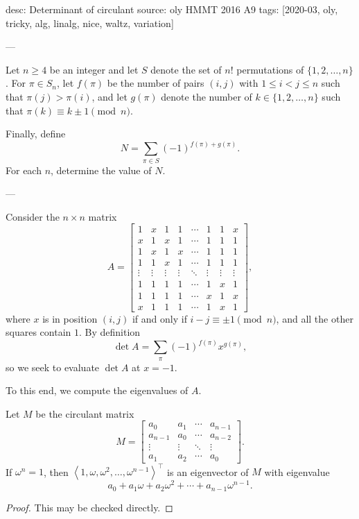 desc: Determinant of circulant
source: oly HMMT 2016 A9
tags: [2020-03, oly, tricky, alg, linalg, nice, waltz, variation]

---

Let $n\ge4$ be an integer and let $S$ denote the set of $n!$ permutations of $\{1,2,\ldots,n\}$. For $\pi\in S_n$, let $f(\pi)$ be the number of pairs $(i,j)$ with $1\le i<j\le n$ such that $\pi(j)>\pi(i)$, and let $g(\pi)$ denote the number of $k\in\{1,2,\ldots,n\}$ such that $\pi(k)\equiv k\pm1\pmod n$.

Finally, define \[N=\sum_{\pi\in S}(-1)^{f(\pi)+g(\pi)}.\]
For each $n$, determine the value of $N$.

---

Consider the $n\times n$ matrix \[A=\begin{bmatrix}
    1&x&1&1&\cdots&1&1&x\\
    x&1&x&1&\cdots&1&1&1\\
    1&x&1&x&\cdots&1&1&1\\
    1&1&x&1&\cdots&1&1&1\\
    \vdots&\vdots&\vdots&\vdots&\ddots&\vdots&\vdots&\vdots\\
    1&1&1&1&\cdots&1&x&1\\
    1&1&1&1&\cdots&x&1&x\\
    x&1&1&1&\cdots&1&x&1
\end{bmatrix},\]
where $x$ is in position $(i,j)$ if and only if $i-j\equiv\pm1\pmod n$, and all the other squares contain $1$. By definition \[\det A=\sum_\pi(-1)^{f(\pi)}x^{g(\pi)},\]
so we seek to evaluate $\det A$ at $x=-1$.

To this end, we compute the eigenvalues of $A$.
\begin{lemma*}
    Let $M$ be the circulant matrix \[M=\begin{bmatrix}
            a_0&a_1&\cdots&a_{n-1}\\
            a_{n-1}&a_0&\cdots&a_{n-2}\\
            \vdots&\vdots&\ddots&\vdots\\
            a_1&a_2&\cdots&a_0
    \end{bmatrix}.\]
    If $\omega^n=1$, then $\left<1,\omega,\omega^2,\ldots,\omega^{n-1}\right>^\top$ is an eigenvector of $M$ with eigenvalue \[a_0+a_1\omega+a_2\omega^2+\cdots+a_{n-1}\omega^{n-1}.\]
\end{lemma*}
\begin{proof}
    This may be checked directly.
\end{proof}

